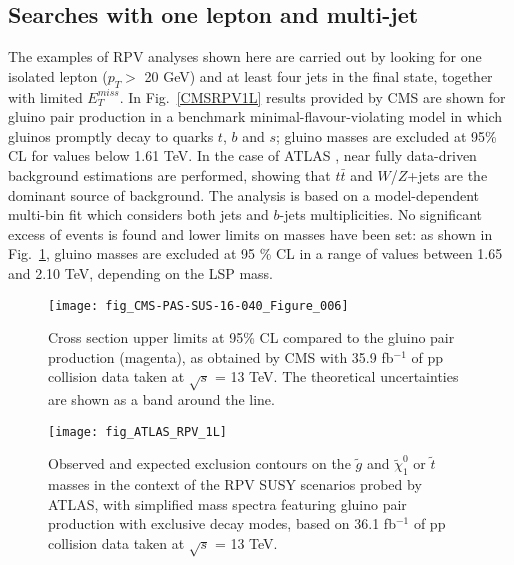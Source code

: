 \documentclass{ws-ijmpcs}
\begin{document}
\subsection{Searches with one lepton and multi-jet}
The examples of RPV analyses shown here are carried out by looking for one isolated lepton ($p_T >$ 20 GeV) and at least four jets in the final state, together with limited $E_T^{miss}$.
In Fig.~\ref{CMSRPV1L} results provided by CMS \cite{CMS_RPV1lep} are shown for gluino pair production in a benchmark minimal-flavour-violating model in which gluinos promptly decay to quarks $t$, $b$ and $s$; gluino masses are excluded at 95\% CL for values below 1.61 TeV. 
In the case of ATLAS \cite{ATLAS_RPV1lep}, near fully data-driven background estimations are performed, showing that $t \bar t$ and $W$/$Z$+jets are the dominant source of background. The analysis is based on a model-dependent multi-bin fit which considers both jets and $b$-jets multiplicities.
No significant excess of events is found and lower limits on masses have been set: as shown in Fig.~\ref{ATLASRPV1L}, gluino masses are excluded at 95 \% CL in a range of values between 1.65 and 2.10 TeV, depending on the LSP mass.

\begin{figure}[!tbp]
  \centering
  \begin{minipage}[b]{0.45\textwidth}
    \texttt{[image: fig\_CMS-PAS-SUS-16-040\_Figure\_006]}
    \caption{Cross section upper limits at 95\% CL compared to the gluino pair production (magenta), as obtained by CMS with 35.9 fb$^{-1}$ of pp collision data taken at $\sqrt{s}$ = 13 TeV. The theoretical uncertainties are shown as a band around the line. \label{CMSRPV1L}}
  \end{minipage}
  \hfill
  \begin{minipage}[b]{0.45\textwidth}
    \texttt{[image: fig\_ATLAS\_RPV\_1L]}
    \caption{Observed and expected exclusion contours on the $\tilde{g}$ and $\tilde{\chi}^0_1$ or $\tilde{t}$ masses in the context of the RPV SUSY scenarios probed by ATLAS, with simplified mass spectra featuring gluino pair production with exclusive decay modes, based on 36.1 fb$^{-1}$ of pp collision data taken at $\sqrt{s}$ = 13 TeV. \label{ATLASRPV1L}}
  \end{minipage}
\end{figure}
\end{document}
